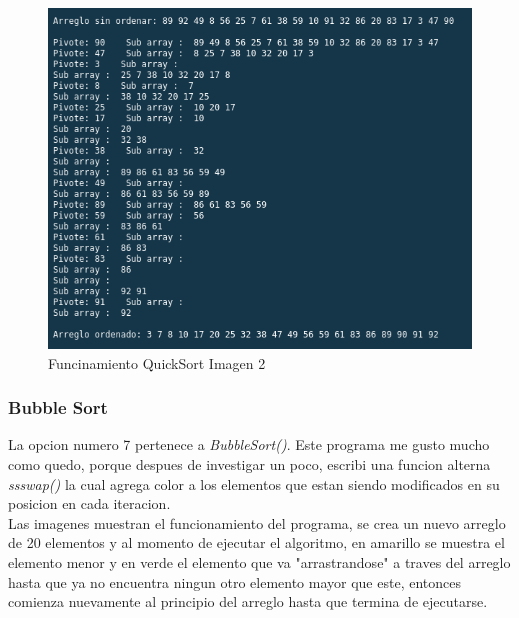 \documentclass{article}
\begin{document}
		\begin{figure}[H]
			\centering
			\includegraphics[scale = 0.7]{images/e3q2.png}
			\caption{Funcinamiento QuickSort Imagen 2}
		\end{figure}
	\newpage
		
		\subsubsection{Bubble Sort}
		
		La opcion numero 7 pertenece a \emph{BubbleSort()}. Este programa me gusto mucho como quedo, porque despues de investigar un poco, escribi una funcion alterna \emph{ssswap()} la cual agrega color a los elementos que estan siendo modificados en su posicion en cada iteracion.\\
		
		Las imagenes muestran el funcionamiento del programa, se crea un nuevo arreglo de 20 elementos y al momento de ejecutar el algoritmo, en amarillo se muestra el elemento menor y en verde el elemento que va "arrastrandose" a traves del arreglo hasta que ya no encuentra ningun otro elemento mayor que este, entonces comienza nuevamente al principio del arreglo hasta que termina de ejecutarse.
		
\end{document}
